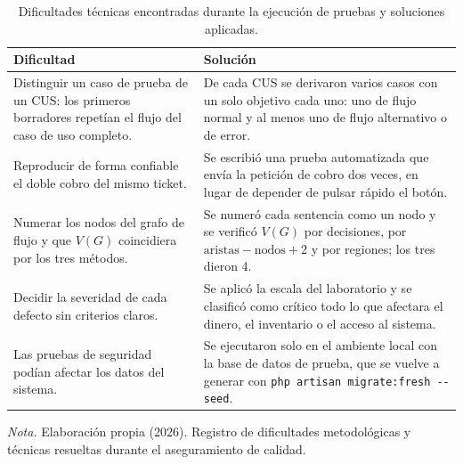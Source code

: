\begin{table}[H]
  \centering
  \small
  \caption{Dificultades técnicas encontradas durante la ejecución de pruebas y soluciones aplicadas.}
  \label{tab:pruebas_dificultades}
  \begin{tabularx}{\linewidth}{|Y|Y|}
    \hline
    \textbf{Dificultad} & \textbf{Solución} \\ \hline
    Distinguir un caso de prueba de un CUS: los primeros borradores repetían el flujo del caso de uso completo. & De cada CUS se derivaron varios casos con un solo objetivo cada uno: uno de flujo normal y al menos uno de flujo alternativo o de error. \\ \hline
    Reproducir de forma confiable el doble cobro del mismo ticket. & Se escribió una prueba automatizada que envía la petición de cobro dos veces, en lugar de depender de pulsar rápido el botón. \\ \hline
    Numerar los nodos del grafo de flujo y que $V(G)$ coincidiera por los tres métodos. & Se numeró cada sentencia como un nodo y se verificó $V(G)$ por decisiones, por $\text{aristas} - \text{nodos} + 2$ y por regiones; los tres dieron 4. \\ \hline
    Decidir la severidad de cada defecto sin criterios claros. & Se aplicó la escala del laboratorio y se clasificó como crítico todo lo que afectara el dinero, el inventario o el acceso al sistema. \\ \hline
    Las pruebas de seguridad podían afectar los datos del sistema. & Se ejecutaron solo en el ambiente local con la base de datos de prueba, que se vuelve a generar con \texttt{php artisan migrate:fresh -{}-seed}. \\ \hline
  \end{tabularx}
  \par\vspace{0.2cm}
  {\raggedright \small \emph{Nota.} Elaboración propia (2026). Registro de dificultades metodológicas y técnicas resueltas durante el aseguramiento de calidad.\par}
\end{table}
